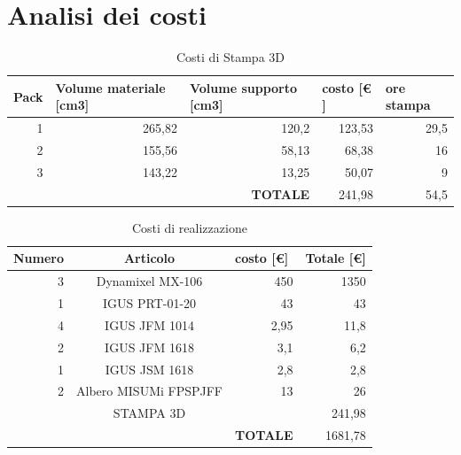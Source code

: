 \documentclass[%
corpo=11pt,
twoside,
 stile=classica,
oldstyle,
greek,%
]{toptesi}
\begin{document}
	\section{Analisi dei costi}
	\begin{table}[htbp]
		\centering
		\caption{Costi di Stampa 3D}
		\begin{tabular}{rr|r|r|r|}
			\hline
			\multicolumn{1}{|l|}{\textbf{Pack}} & \multicolumn{1}{l|}{\textbf{Volume materiale [cm3]}} & \multicolumn{1}{l|}{\textbf{Volume supporto [cm3]}} & \multicolumn{1}{l|}{\textbf{costo [€ ]}} & \multicolumn{1}{l|}{\textbf{ore stampa}} \bigstrut\\
			\hline
			\multicolumn{1}{|r|}{1} & 265,82 & 120,2 & 123,53 & 29,5 \bigstrut\\
			\hline
			\multicolumn{1}{|r|}{2} & 155,56 & 58,13 & 68,38 & 16 \bigstrut\\
			\hline
			\multicolumn{1}{|r|}{3} & 143,22 & 13,25 & 50,07 & 9 \bigstrut\\
			\hline
			&       & \textbf{TOTALE} & 241,98 & 54,5 \bigstrut\\
			\cline{3-5}    \end{tabular}%
		\label{tab:printcost}%
	\end{table}%
	
	\begin{table}[htbp]
		\centering
		\caption{Costi di realizzazione}
		\begin{tabular}{rrr|r|r|}
			\hline
			\multicolumn{1}{|l|}{\textbf{Numero}} & \multicolumn{2}{c|}{\textbf{Articolo}} & \multicolumn{1}{l|}{\textbf{costo [€]}} & \multicolumn{1}{l|}{\textbf{Totale [€]}} \bigstrut\\
			\hline
			\multicolumn{1}{|r|}{3} & \multicolumn{2}{c|}{Dynamixel MX-106} & 450   & 1350 \bigstrut\\
			\hline
			\multicolumn{1}{|r|}{1} & \multicolumn{2}{c|}{IGUS PRT-01-20} & 43    & 43 \bigstrut\\
			\hline
			\multicolumn{1}{|r|}{4} & \multicolumn{2}{c|}{IGUS JFM 1014} & 2,95  & 11,8 \bigstrut\\
			\hline
			\multicolumn{1}{|r|}{2} & \multicolumn{2}{c|}{IGUS JFM 1618} & 3,1   & 6,2 \bigstrut\\
			\hline
			\multicolumn{1}{|r|}{1} & \multicolumn{2}{c|}{IGUS JSM 1618} & 2,8   & 2,8 \bigstrut\\
			\hline
			\multicolumn{1}{|r|}{2} & \multicolumn{2}{c|}{Albero MISUMi FPSPJFF} & 13    & 26 \bigstrut\\
			\hline
			\multicolumn{1}{|r|}{} & \multicolumn{2}{c|}{STAMPA 3D} &       & 241,98 \bigstrut\\
			\hline
			&       &       & \textbf{TOTALE} & 1681,78 \bigstrut\\
			\cline{4-5}    \end{tabular}%
		\label{tab:projectcost}%
	\end{table}%
	
\end{document}
